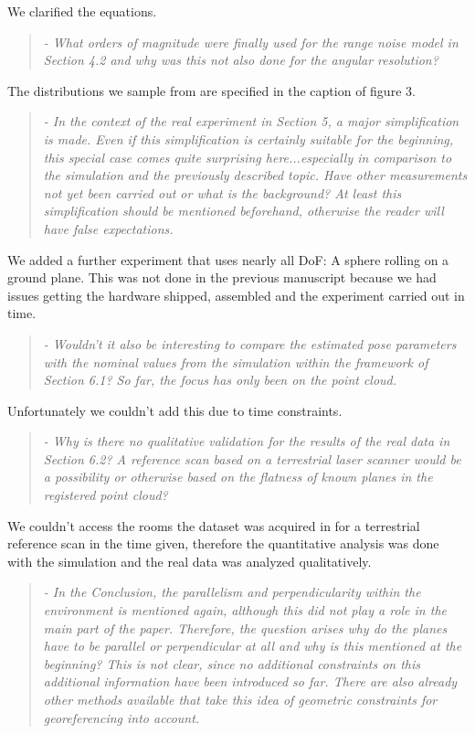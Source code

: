 \documentclass{article}
\newenvironment{itquote}
  {\begin{quote}\itshape}
  {\end{quote}\ignorespacesafterend}
\begin{document}
We clarified the equations.

\begin{itquote} 
- What orders of magnitude were finally used for the range noise
model in Section 4.2 and why was this not also done for the angular
resolution?
\end{itquote}

The distributions we sample from are specified in the caption of 
figure 3. 

\begin{itquote}
- In the context of the real experiment in Section 5, a major
simplification is made. Even if this simplification is certainly
suitable for the beginning, this special case comes quite surprising
here...especially in comparison to the simulation and the previously
described topic. Have other measurements not yet been carried out or
what is the background? At least this simplification should be
mentioned beforehand, otherwise the reader will have false
expectations.
\end{itquote}

We added a further experiment that uses nearly all DoF: A sphere rolling
on a ground plane. This was not done in the previous manuscript because
we had issues getting the hardware shipped, assembled and the experiment 
carried out in time.

\begin{itquote}
- Wouldn't it also be interesting to compare the estimated pose
parameters with the nominal values from the simulation within the
framework of Section 6.1? So far, the focus has only been on the
point cloud.
\end{itquote}

Unfortunately we couldn't add this due to time constraints.

\begin{itquote}
- Why is there no qualitative validation for the results of the real
data in Section 6.2? A reference scan based on a terrestrial laser
scanner would be a possibility or otherwise based on the flatness of
known planes in the registered point cloud?
\end{itquote}

We couldn't access the rooms the dataset was acquired in for a terrestrial 
reference scan in the time given, therefore the quantitative analysis was done with the simulation and the real data was analyzed qualitatively.

\begin{itquote}
- In the Conclusion, the parallelism and perpendicularity within the
environment is mentioned again, although this did not play a role in
the main part of the paper. Therefore, the question arises why do
the planes have to be parallel or perpendicular at all and why is
this mentioned at the beginning? This is not clear, since no
additional constraints on this additional information have been
introduced so far. There are also already other methods available
that take this idea of geometric constraints for georeferencing into
account.
\end{itquote}
\end{document}
